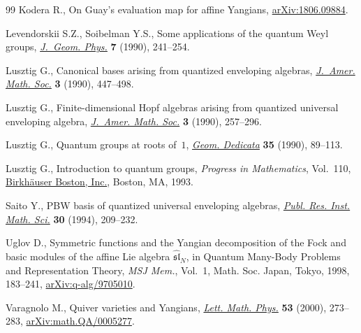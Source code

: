 \documentclass[10pt,a4paper]{amsart}
\theoremstyle{definition}
\numberwithin{equation}{section}
\begin{document}
\begin{thebibliography}{99}
Kodera R., On Guay's evaluation map for affine {Y}angians, \href{https://arxiv.org/abs/1806.09884}{arXiv:1806.09884}.

Levendorskii S.Z., Soibelman Y.S., Some applications of the quantum {W}eyl
 groups, \href{https://doi.org/10.1016/0393-0440(90)90013-S}{\textit{J.~Geom. Phys.}} \textbf{7} (1990), 241--254.

Lusztig G., Canonical bases arising from quantized enveloping algebras,
 \href{https://doi.org/10.2307/1990961}{\textit{J.~Amer. Math. Soc.}} \textbf{3} (1990), 447--498.

Lusztig G., Finite-dimensional {H}opf algebras arising from quantized universal
 enveloping algebra, \href{https://doi.org/10.2307/1990988}{\textit{J.~Amer. Math. Soc.}} \textbf{3} (1990), 257--296.

Lusztig G., Quantum groups at roots of~{$1$}, \href{https://doi.org/10.1007/BF00147341}{\textit{Geom. Dedicata}}
 \textbf{35} (1990), 89--113.

Lusztig G., Introduction to quantum groups, \textit{Progress in Mathematics},
 Vol.~110, \href{https://doi.org/10.1007/978-0-8176-4717-9}{Birkh\"{a}user Boston, Inc.}, Boston, MA, 1993.

Saito Y., P{BW} basis of quantized universal enveloping algebras, \href{https://doi.org/10.2977/prims/1195166130}{\textit{Publ.
 Res. Inst. Math. Sci.}} \textbf{30} (1994), 209--232.

Uglov D., Symmetric functions and the {Y}angian decomposition of the {F}ock and
 basic modules of the affine {L}ie algebra {$\widehat{\mathfrak{sl}}_N$}, in
 Quantum Many-Body Problems and Representation Theory, \textit{MSJ Mem.},
 Vol.~1, Math. Soc. Japan, Tokyo, 1998, 183--241, \href{https://arxiv.org/abs/q-alg/9705010}{arXiv:q-alg/9705010}.

Varagnolo M., Quiver varieties and {Y}angians, \href{https://doi.org/10.1023/A:1007674020905}{\textit{Lett. Math. Phys.}}
 \textbf{53} (2000), 273--283, \href{https://arxiv.org/abs/math.QA/0005277}{arXiv:math.QA/0005277}.

\end{thebibliography}
\end{document}
